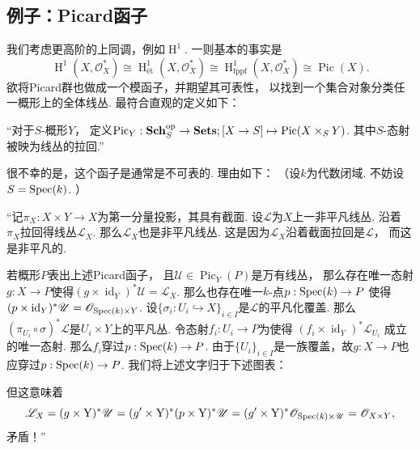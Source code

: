     \subsection{例子：Picard函子}
    我们考虑更高阶的上同调，例如$\operatorname{H}^{1}$. 
    一则基本的事实是
    \[\operatorname{H}^{1}(X,\mathscr{O}_{X}^{*}) 
    \cong \operatorname{H}_{\mathrm{ét}}^{1}(X,\mathscr{O}_{X}^{*})
    \cong \operatorname{H}_{\mathrm{fppf}}^{1}(X,\mathscr{O}_{X}^{*})
    \cong \operatorname{Pic}(X).\]
    欲将Picard群也做成一个模函子，并期望其可表性，
    以找到一个集合对象分类任一概形上的全体线丛. 最符合直观的定义如下：

    “对于$S$-概形$Y$，
    定义$\operatorname{Pic}_{Y}:\mathbf{Sch}_{S}^{\mathrm{op}} \to \mathbf{Sets};
    [X \to S] \mapsto \operatorname{Pic}(X \times_{S} Y)$.
    其中$S$-态射被映为线丛的拉回.”

    很不幸的是，这个函子是通常是不可表的. 
    理由如下：
    （设$k$为代数闭域. 不妨设$S = \operatorname{Spec}(k)$. ）

    “记$\pi_{X}:X \times Y \to X$为第一分量投影，其具有截面. 
    设$\mathscr{L}$为$X$上一非平凡线丛. 
    沿着$\pi_{X}$拉回得线丛$\mathscr{L}_{X}$. 
    那么$\mathscr{L}_{X}$也是非平凡线丛. 
    这是因为$\mathscr{L}_{X}$沿着截面拉回是$\mathscr{L}$，
    而这是非平凡的.

    若概形$P$表出上述Picard函子，
    且$\mathscr{U} \in \operatorname{Pic}_{Y}(P)$是万有线丛，
    那么存在唯一态射$g:X \to P$使得$(g \times \operatorname{id}_{Y})^{*}\mathscr{U} = \mathscr{L}_{X}$.
    那么也存在唯一$k$-点$p:\operatorname{Spec}(k) \to P$
    使得$(p \times \operatorname{id}_{Y})^{*}\mathscr{U} = \mathscr{O}_{\operatorname{Spec}(k) \times Y}$.
    设$\{\sigma_{i}:U_{i} \hookrightarrow X\}_{i \in I}$是$\mathscr{L}$的平凡化覆盖.
    那么$(\pi_{U_{i}} \circ \sigma)^{*}\mathscr{L}$是$U_{i} \times Y$上的平凡丛.
    令态射$f_{i}:U_{i} \to P$为使得
    $(f_{i} \times \operatorname{id}_{Y})^{*}\mathscr{L}_{U_{i}}$
    成立的唯一态射. 那么$f_{i}$穿过$p:\operatorname{Spec}(k) \to P$. 
    由于$\{U_{i}\}_{i \in I}$是一族覆盖，故$g:X \to P$也应穿过$p:\operatorname{Spec}(k) \to P$.
    我们将上述文字归于下述图表：
    \begin{center}\end{center}
    但这意味着
    \[\mathscr{L}_{X} = (g \times \operatorname{Y})^{*}\mathscr{U}
    = (g' \times \operatorname{Y})^{*}(p \times \operatorname{Y})^{*}\mathscr{U}
    = (g' \times \operatorname{Y})^{*}\mathscr{O}_{\operatorname{Spec}(k) \times \mathscr{U}}
    = \mathscr{O}_{X \times Y},\]
    矛盾！”
    

